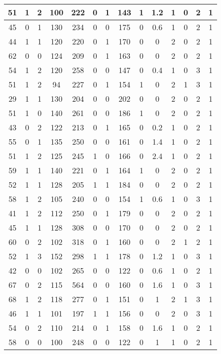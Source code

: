 \documentclass{article}
\begin{document}
\begin{longtable}{|c|c|c|c|c|c|c|c|c|c|c|c|c|c|}
51 & 1 & 2 & 100 & 222 & 0 & 1 & 143 & 1 & 1.2 & 1 & 0 & 2 & 1 \\ \hline
45 & 0 & 1 & 130 & 234 & 0 & 0 & 175 & 0 & 0.6 & 1 & 0 & 2 & 1 \\ \hline
44 & 1 & 1 & 120 & 220 & 0 & 1 & 170 & 0 & 0 & 2 & 0 & 2 & 1 \\ \hline
62 & 0 & 0 & 124 & 209 & 0 & 1 & 163 & 0 & 0 & 2 & 0 & 2 & 1 \\ \hline
54 & 1 & 2 & 120 & 258 & 0 & 0 & 147 & 0 & 0.4 & 1 & 0 & 3 & 1 \\ \hline
51 & 1 & 2 & 94 & 227 & 0 & 1 & 154 & 1 & 0 & 2 & 1 & 3 & 1 \\ \hline
29 & 1 & 1 & 130 & 204 & 0 & 0 & 202 & 0 & 0 & 2 & 0 & 2 & 1 \\ \hline
51 & 1 & 0 & 140 & 261 & 0 & 0 & 186 & 1 & 0 & 2 & 0 & 2 & 1 \\ \hline
43 & 0 & 2 & 122 & 213 & 0 & 1 & 165 & 0 & 0.2 & 1 & 0 & 2 & 1 \\ \hline
55 & 0 & 1 & 135 & 250 & 0 & 0 & 161 & 0 & 1.4 & 1 & 0 & 2 & 1 \\ \hline
51 & 1 & 2 & 125 & 245 & 1 & 0 & 166 & 0 & 2.4 & 1 & 0 & 2 & 1 \\ \hline
59 & 1 & 1 & 140 & 221 & 0 & 1 & 164 & 1 & 0 & 2 & 0 & 2 & 1 \\ \hline
52 & 1 & 1 & 128 & 205 & 1 & 1 & 184 & 0 & 0 & 2 & 0 & 2 & 1 \\ \hline
58 & 1 & 2 & 105 & 240 & 0 & 0 & 154 & 1 & 0.6 & 1 & 0 & 3 & 1 \\ \hline
41 & 1 & 2 & 112 & 250 & 0 & 1 & 179 & 0 & 0 & 2 & 0 & 2 & 1 \\ \hline
45 & 1 & 1 & 128 & 308 & 0 & 0 & 170 & 0 & 0 & 2 & 0 & 2 & 1 \\ \hline
60 & 0 & 2 & 102 & 318 & 0 & 1 & 160 & 0 & 0 & 2 & 1 & 2 & 1 \\ \hline
52 & 1 & 3 & 152 & 298 & 1 & 1 & 178 & 0 & 1.2 & 1 & 0 & 3 & 1 \\ \hline
42 & 0 & 0 & 102 & 265 & 0 & 0 & 122 & 0 & 0.6 & 1 & 0 & 2 & 1 \\ \hline
67 & 0 & 2 & 115 & 564 & 0 & 0 & 160 & 0 & 1.6 & 1 & 0 & 3 & 1 \\ \hline
68 & 1 & 2 & 118 & 277 & 0 & 1 & 151 & 0 & 1 & 2 & 1 & 3 & 1 \\ \hline
46 & 1 & 1 & 101 & 197 & 1 & 1 & 156 & 0 & 0 & 2 & 0 & 3 & 1 \\ \hline
54 & 0 & 2 & 110 & 214 & 0 & 1 & 158 & 0 & 1.6 & 1 & 0 & 2 & 1 \\ \hline
58 & 0 & 0 & 100 & 248 & 0 & 0 & 122 & 0 & 1 & 1 & 0 & 2 & 1 \\ \hline

\end{longtable}
\end{document}
